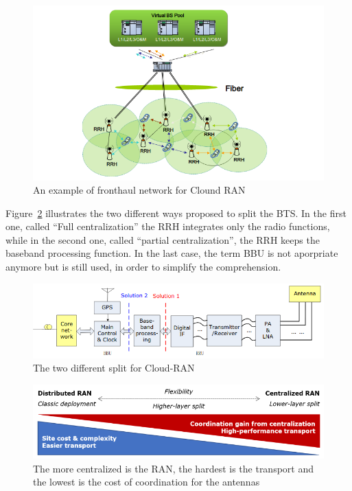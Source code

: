 \documentclass[a4paper,10pt]{article}
\begin{document}
  \begin{figure}[h]
      \begin{center}
      \includegraphics[width=1\textwidth]{fronthaul.png}
      \end{center}
      \caption{An example of fronthaul network for Clound RAN}\label{fig:fronthaul}
      \end{figure}
      
      Figure~\ref{fig:CRANsplit} illustrates the two different ways proposed to split the BTS. In the first one, called ``Full centralization'' the RRH integrates only the radio functions, while in the second one, called ``partial centralization'', the RRH keeps the baseband processing function. In the last case, the term BBU is not aporpriate anymore but is still used, in order to simplify the comprehension.
   \begin{figure}[h]
      \begin{center}
      \includegraphics[width=1\textwidth]{CRANsplit.png}
      \end{center}
      \caption{The two different split for Cloud-RAN}\label{fig:CRANsplit}
      \end{figure}
      \begin{figure}[h]
      \begin{center}
      \includegraphics[width=1\textwidth]{flexibility.png}
      \end{center}
      \caption{The more centralized is the RAN, the hardest is the transport and the lowest is the cost of coordination for the antennas}\label{fig:flexibility}
      \end{figure}
       
\end{document}
